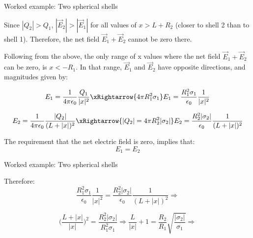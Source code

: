 {%
%
%

\begin{frame}{Worked example: Two spherical shells}

  Since $|Q_2| > Q_1$,
  $|\vec{E}_2|>|\vec{E}_1|$ for all values of $x > L + R_2$
  (closer to shell 2 than to shell 1). Therefore,
  the net field $\vec{E}_1 + \vec{E}_2$ cannot be zero there.\\

  \vspace{0.3cm}

  Following from the above, the only range of x values where
  the net field $\vec{E}_1 + \vec{E}_2$ can be zero, is $x < -R_1$.
  In that range,  $\vec{E}_1$ and $\vec{E}_2$ have opposite directions,
  and magnitudes given by:

  \begin{equation*}
  	 E_1 = \frac{1}{4\pi \epsilon_0} \frac{Q_1}{|x|^2} \xRightarrow{4\pi R_{1}^{2} \sigma_{1}}
  	 E_1 = \frac{R_{1}^{2} \sigma_{1}}{\epsilon_0} \frac{1}{|x|^2}
  \end{equation*}

  \begin{equation*}
  	 E_2 = \frac{1}{4\pi \epsilon_0} \frac{|Q_2|}{(L+|x|)^2} \xRightarrow{|Q_2|=4\pi R_{2}^{2} |\sigma_{2}|}
  	 E_2 = \frac{R_{2}^{2} |\sigma_{2}|}{\epsilon_0} \frac{1}{(L+|x|)^2}
  \end{equation*}

  The requirement that the net electric field is zero, implies that:
  \begin{equation*}
  	 E_1 = E_2
  \end{equation*}

\end{frame}

%
%
%

\begin{frame}{Worked example: Two spherical shells}

  Therefore:
  \begin{equation*}
    \frac{R_{1}^{2} \sigma_{1}}{\epsilon_0} \frac{1}{|x|^2} =
    \frac{R_{2}^{2} |\sigma_{2}|}{\epsilon_0} \frac{1}{(L+|x|)^2} \Rightarrow
  \end{equation*}

  \begin{equation*}
    \Big( \frac{L+|x|}{|x|} \Big)^2 = \frac{R_{2}^{2} |\sigma_{2}|}{R_{1}^{2} \sigma_{1}} \Rightarrow
    \frac{L}{|x|} + 1  = \frac{R_{2}}{R_{1}} \sqrt{\frac{|\sigma_{2}|}{\sigma_{1}}} \Rightarrow
  \end{equation*}


\end{frame}}
